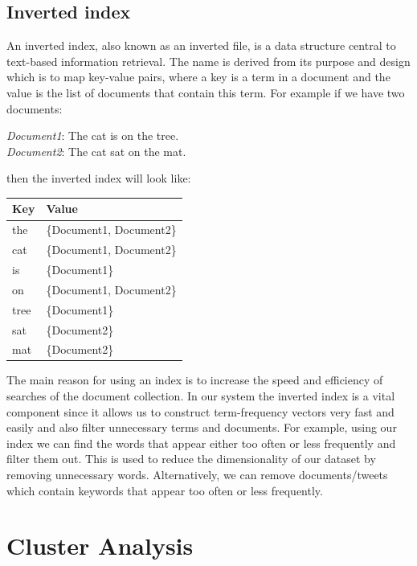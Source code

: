 \subsection{Inverted index}
An inverted index, also known as an inverted file, is a data structure central to text-based information retrieval. The name is derived from its 
purpose and design which is to map key-value pairs, where a key is a term in a document and the value is the list of documents that contain this term.
For example if we have two documents:\\
\begin{center}
\emph{Document1}: The cat is on the tree. \\
\emph{Document2}: The cat sat on the mat. \\
\end{center}
then the inverted index will look like:

\begin{center}
\begin{tabular}{ |l | l| }
  \hline
  \textbf{Key} & \textbf{Value} \\ \hline
  the & \{Document1, Document2\} \\
  cat & \{Document1, Document2\} \\
  is & \{Document1\} \\
  on & \{Document1, Document2\} \\
  tree & \{Document1\} \\
  sat & \{Document2\} \\
  mat & \{Document2\} \\
  \hline
\end{tabular}
\end{center}
The main reason for using an index is to increase the speed and efficiency of searches of the document 
collection. In our system the inverted index is a vital component since it allows us to construct
term-frequency vectors very fast and easily and also filter unnecessary terms and documents. For example, using our index we
can find the words that appear either too often or less frequently and filter them out. This is used
to reduce the dimensionality of our dataset by removing unnecessary words. Alternatively, we
can remove documents/tweets which contain keywords that appear too often or less frequently.

\section{Cluster Analysis}

